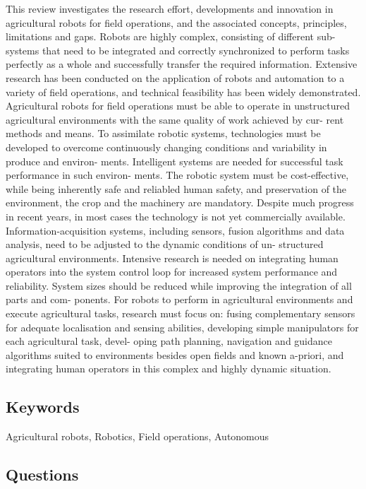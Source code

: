 \documentclass{article}
\begin{document}
This review investigates the research effort, developments and innovation in agricultural
robots for field operations, and the associated concepts, principles, limitations and gaps.
Robots are highly complex, consisting of different sub-systems that need to be integrated
and correctly synchronized to perform tasks perfectly as a whole and successfully transfer
the required information. Extensive research has been conducted on the application of
robots and automation to a variety of field operations, and technical feasibility has been
widely demonstrated. Agricultural robots for field operations must be able to operate in
unstructured agricultural environments with the same quality of work achieved by cur-
rent methods and means. To assimilate robotic systems, technologies must be developed
to overcome continuously changing conditions and variability in produce and environ-
ments. Intelligent systems are needed for successful task performance in such environ-
ments. The robotic system must be cost-effective, while being inherently safe and
reliabled human safety, and preservation of the environment, the crop and the machinery
are mandatory. Despite much progress in recent years, in most cases the technology is not
yet commercially available. Information-acquisition systems, including sensors, fusion
algorithms and data analysis, need to be adjusted to the dynamic conditions of un-
structured agricultural environments. Intensive research is needed on integrating human
operators into the system control loop for increased system performance and reliability.
System sizes should be reduced while improving the integration of all parts and com-
ponents. For robots to perform in agricultural environments and execute agricultural
tasks, research must focus on: fusing complementary sensors for adequate localisation
and sensing abilities, developing simple manipulators for each agricultural task, devel-
oping path planning, navigation and guidance algorithms suited to environments besides
open fields and known a-priori, and integrating human operators in this complex and
highly dynamic situation.


\subsection*{Keywords}
Agricultural robots, Robotics, Field operations, Autonomous


\subsection*{Questions}
\end{document}
